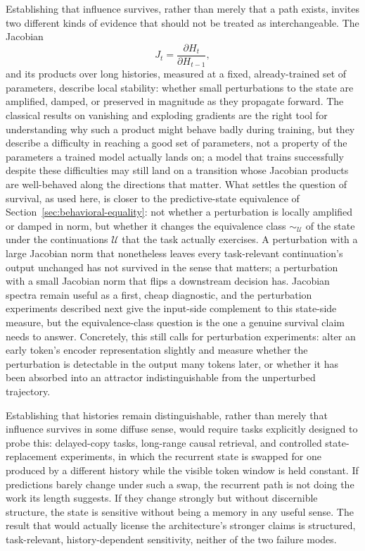 \documentclass[11pt]{article}
\begin{document}
Establishing that influence survives, rather than merely that a path exists, invites two different kinds of evidence that should not be treated as interchangeable. The Jacobian
\[
J_t = \frac{\partial H_t}{\partial H_{t-1}},
\]
and its products over long histories, measured at a fixed, already-trained set of parameters, describe local stability: whether small perturbations to the state are amplified, damped, or preserved in magnitude as they propagate forward. The classical results on vanishing and exploding gradients \cite{bengio1994longterm,pascanu2013difficulty} are the right tool for understanding why such a product might behave badly during training, but they describe a difficulty in reaching a good set of parameters, not a property of the parameters a trained model actually lands on; a model that trains successfully despite these difficulties may still land on a transition whose Jacobian products are well-behaved along the directions that matter. What settles the question of survival, as used here, is closer to the predictive-state equivalence of Section~\ref{sec:behavioral-equality}: not whether a perturbation is locally amplified or damped in norm, but whether it changes the equivalence class $\sim_{\mathcal{U}}$ of the state under the continuations $\mathcal{U}$ that the task actually exercises. A perturbation with a large Jacobian norm that nonetheless leaves every task-relevant continuation's output unchanged has not survived in the sense that matters; a perturbation with a small Jacobian norm that flips a downstream decision has. Jacobian spectra remain useful as a first, cheap diagnostic, and the perturbation experiments described next give the input-side complement to this state-side measure, but the equivalence-class question is the one a genuine survival claim needs to answer. Concretely, this still calls for perturbation experiments: alter an early token's encoder representation slightly and measure whether the perturbation is detectable in the output many tokens later, or whether it has been absorbed into an attractor indistinguishable from the unperturbed trajectory.

Establishing that histories remain distinguishable, rather than merely that influence survives in some diffuse sense, would require tasks explicitly designed to probe this: delayed-copy tasks, long-range causal retrieval, and controlled state-replacement experiments, in which the recurrent state is swapped for one produced by a different history while the visible token window is held constant. If predictions barely change under such a swap, the recurrent path is not doing the work its length suggests. If they change strongly but without discernible structure, the state is sensitive without being a memory in any useful sense. The result that would actually license the architecture's stronger claims is structured, task-relevant, history-dependent sensitivity, neither of the two failure modes.
\end{document}

